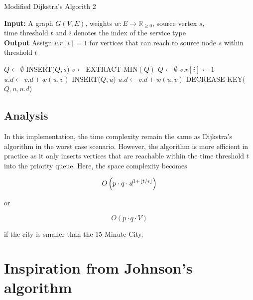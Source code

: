\begin{algorithm}[H]
    \caption{Modified Dijkstra's Algorith 2} \label{alg:modified_dijsktra2}
    \textbf{Input:} A graph $G(V,E)$, weights $w:E\rightarrow\mathbb{R}_{\geq 0}$, source vertex $s$, \\  time threshold $t$ and $i$ denotes the index of the service type\\
    \textbf{Output} Assign $v.r[i]=1$ for vertices that can reach to source node $s$ within threshold $t$ %
    \begin{algorithmic}
        \State $Q\gets\emptyset$ 
        \State INSERT($Q,s$)
            \State $v\gets$EXTRACT-MIN$(Q)$
                \State $Q\gets\emptyset$ 
            \Else
                \State $v.r[i] \gets 1$
                        \State $u.d\gets v.d+w(u,v)$ %
                        \State INSERT($Q,u$)
                        \State $u.d\gets v.d+w(u,v)$
                        \State DECREASE-KEY($Q,u,u.d$)
                    \EndIf
                \EndFor
            \EndIf
        \EndWhile
    \end{algorithmic}
\end{algorithm}

\subsection{Analysis}

In this implementation, the time complexity remain the same as Dijkstra's algorithm in the worst case scenario. However, the algorithm is more efficient in practice as it only inserts vertices that are reachable within the time threshold $t$ into the priority queue. Here, the space complexity becomes

$$O\left(p\cdot q\cdot d^{1+\floor*{t/\epsilon}}\right)$$

or

$$O\left(p\cdot q\cdot V\right)$$

if the city is smaller than the 15-Minute City.

\section{Inspiration from Johnson's algorithm}

